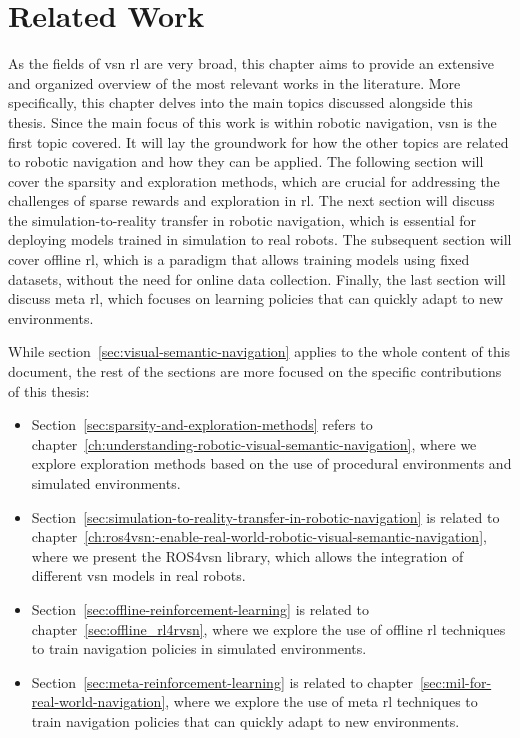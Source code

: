 \chapter{Related Work}\label{ch:related-work}

As the fields of \acrshort{vsn} \acrshort{rl} are very broad, this chapter aims to provide an extensive and organized overview of the most relevant works in the literature.
More specifically, this chapter delves into the main topics discussed alongside this thesis.
Since the main focus of this work is within robotic navigation, \acrlong{vsn} is the first topic covered.
It will lay the groundwork for how the other topics are related to robotic navigation and how they can be applied.
The following section will cover the sparsity and exploration methods, which are crucial for addressing the challenges of sparse rewards and exploration in \acrshort{rl}.
The next section will discuss the simulation-to-reality transfer in robotic navigation, which is essential for deploying models trained in simulation to real robots.
The subsequent section will cover offline \acrshort{rl}, which is a paradigm that allows training models using fixed datasets, without the need for online data collection.
Finally, the last section will discuss meta \acrshort{rl}, which focuses on learning policies that can quickly adapt to new environments.

While section~\ref{sec:visual-semantic-navigation} applies to the whole content of this document, the rest of the sections are more focused on the specific contributions of this thesis:

\begin{itemize}
    \item Section~\ref{sec:sparsity-and-exploration-methods} refers to chapter~\ref{ch:understanding-robotic-visual-semantic-navigation}, where we explore exploration methods based on the use of procedural environments and simulated environments.
    \item Section~\ref{sec:simulation-to-reality-transfer-in-robotic-navigation} is related to chapter~\ref{ch:ros4vsn:-enable-real-world-robotic-visual-semantic-navigation}, where we present the ROS4\acrshort{vsn} library, which allows the integration of different \acrshort{vsn} models in real robots.
    \item Section~\ref{sec:offline-reinforcement-learning} is related to chapter~\ref{sec:offline_rl4rvsn}, where we explore the use of offline \acrshort{rl} techniques to train navigation policies in simulated environments.
    \item Section~\ref{sec:meta-reinforcement-learning} is related to chapter~\ref{sec:mil-for-real-world-navigation}, where we explore the use of meta \acrshort{rl} techniques to train navigation policies that can quickly adapt to new environments.
\end{itemize}

